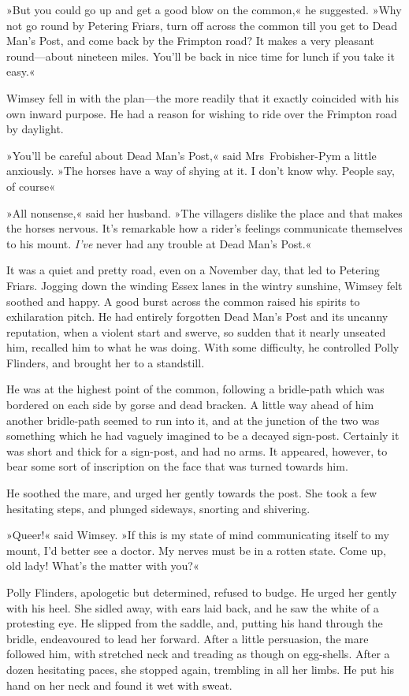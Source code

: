 »But you could go up and get a good blow on the common,« he suggested. »Why not go round by Petering Friars, turn off across the common till you get to Dead Man's Post, and come back by the Frimpton road? It makes a very pleasant round—about nineteen miles. You'll be back in nice time for lunch if you take it easy.«

Wimsey fell in with the plan—the more readily that it exactly coincided with his own inward purpose. He had a reason for wishing to ride over the Frimpton road by daylight.

»You'll be careful about Dead Man's Post,« said Mrs~Frobisher-Pym a little anxiously. »The horses have a way of shying at it. I don't know why. People say, of course\longdash«

»All nonsense,« said her husband. »The villagers dislike the place and that makes the horses nervous. It's remarkable how a rider's feelings communicate themselves to his mount. \textit{I've} never had any trouble at Dead Man's Post.«

It was a quiet and pretty road, even on a November day, that led to Petering Friars. Jogging down the winding Essex lanes in the wintry sunshine, Wimsey felt soothed and happy. A good burst across the common raised his spirits to exhilaration pitch. He had entirely forgotten Dead Man's Post and its uncanny reputation, when a violent start and swerve, so sudden that it nearly unseated him, recalled him to what he was doing. With some difficulty, he controlled Polly Flinders, and brought her to a standstill.

He was at the highest point of the common, following a bridle-path which was bordered on each side by gorse and dead bracken. A little way ahead of him another bridle-path seemed to run into it, and at the junction of the two was something which he had vaguely imagined to be a decayed sign-post. Certainly it was short and thick for a sign-post, and had no arms. It appeared, however, to bear some sort of inscription on the face that was turned towards him.

He soothed the mare, and urged her gently towards the post. She took a few hesitating steps, and plunged sideways, snorting and shivering.

»Queer!« said Wimsey. »If this is my state of mind communicating itself to my mount, I'd better see a doctor. My nerves must be in a rotten state. Come up, old lady! What's the matter with you?«

Polly Flinders, apologetic but determined, refused to budge. He urged her gently with his heel. She sidled away, with ears laid back, and he saw the white of a protesting eye. He slipped from the saddle, and, putting his hand through the bridle, endeavoured to lead her forward. After a little persuasion, the mare followed him, with stretched neck and treading as though on egg-shells. After a dozen hesitating paces, she stopped again, trembling in all her limbs. He put his hand on her neck and found it wet with sweat.

